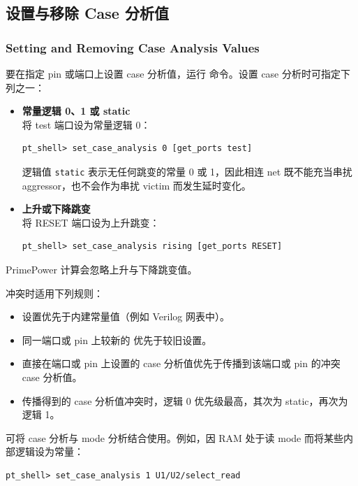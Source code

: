 \subsection{设置与移除 Case 分析值}
\subsubsection*{Setting and Removing Case Analysis Values}

要在指定 pin 或端口上设置 case 分析值，运行  命令。设置 case 分析时可指定下列之一：

\begin{itemize}
  \item \textbf{常量逻辑 0、1 或 static}\\
        将 test 端口设为常量逻辑 0：
\begin{lstlisting}
pt_shell> set_case_analysis 0 [get_ports test]
\end{lstlisting}
        逻辑值 \texttt{static} 表示无任何跳变的常量 0 或 1，因此相连 net 既不能充当串扰 aggressor，也不会作为串扰 victim 而发生延时变化。
  \item \textbf{上升或下降跳变}\\
        将 RESET 端口设为上升跳变：
\begin{lstlisting}
pt_shell> set_case_analysis rising [get_ports RESET]
\end{lstlisting}
\end{itemize}


\begin{noteBox}
PrimePower 计算会忽略上升与下降跳变值。
\end{noteBox}

冲突时适用下列规则：
\begin{itemize}
  \item {} 设置优先于内建常量值（例如 Verilog 网表中）。
  \item 同一端口或 pin 上较新的  优先于较旧设置。
  \item 直接在端口或 pin 上设置的 case 分析值优先于传播到该端口或 pin 的冲突 case 分析值。
  \item 传播得到的 case 分析值冲突时，逻辑 0 优先级最高，其次为 static，再次为逻辑 1。
\end{itemize}

可将 case 分析与 mode 分析结合使用。例如，因 RAM 处于读 mode 而将某些内部逻辑设为常量：
\begin{lstlisting}
pt_shell> set_case_analysis 1 U1/U2/select_read
\end{lstlisting}

